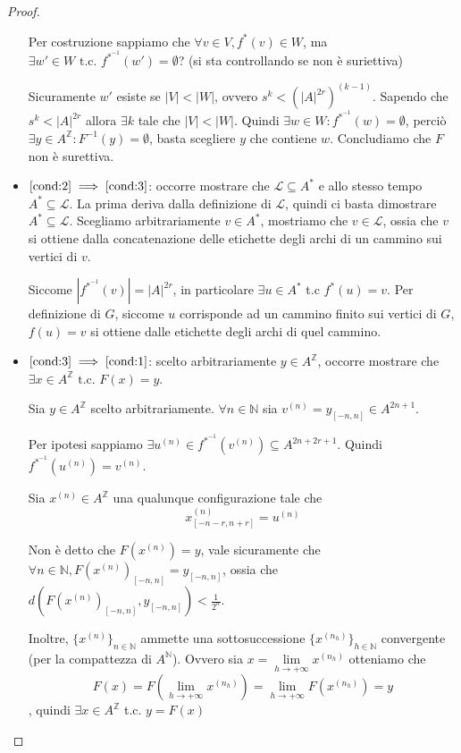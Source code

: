 \begin{teorema}
\begin{proof}
\begin{itemize}
            Per costruzione sappiamo che $\forall v\in V, f^{\ast}(v)\in W$, ma $\exists
            w'\in W\text{ t.c. } f^{\ast^{-1}} (w')= \emptyset$? (si sta controllando se non è suriettiva)
            
            Sicuramente $w'$ esiste se $|V|<|W|$, ovvero  $s^k<(|A|^{2r})^{(k-1)}$.
            Sapendo che $s^k < |A|^{2r}$ allora $\exists k$ tale che  $|V|<|W|$.
            Quindi $\exists w \in W: f^{\ast^{-1}} (w) =\emptyset$, perciò 
            $\exists y \in A^{\mathbb{Z}}: F^{-1}(y) = \emptyset$, basta scegliere 
            $y$ che contiene $w$. Concludiamo che $F$ non è surettiva.
            
            \item $\ref{cond:2}\implies \ref{cond:3}$: occorre mostrare che $\mathcal{L} \subseteq A^\ast$
            e allo stesso tempo $ A^\ast \subseteq\mathcal{L}$. La prima deriva 
            dalla definizione di $\mathcal{L}$, quindi ci basta dimostrare 
            $A^\ast \subseteq\mathcal{L}$. Scegliamo arbitrariamente $v\in  A^\ast$,
            mostriamo che $v\in \mathcal{L}$, ossia che $v$ si ottiene dalla concatenazione
            delle etichette degli archi di un cammino sui vertici di $v$.
            
            Siccome $|f^{\ast^{-1}}(v)| = |A|^{2r}$, in particolare $\exists u \in A^\ast$
            t.c $f^\ast(u) = v$. Per definizione di $G$, siccome $u$ corrisponde 
            ad un cammino finito sui vertici di $G$, $f(u)=v$ si ottiene dalle etichette
            degli archi di quel cammino.
            \item $\ref{cond:3}\implies \ref{cond:1}$: scelto arbitrariamente $y\in A^\mathbb{Z}$,
            occorre mostrare che $\exists x\in A^\mathbb{Z} \text{ t.c. } F(x) =y$.

            Sia $y\in A^\mathbb{Z}$ scelto arbitrariamente. $\forall n\in \mathbb{N}$ 
            sia $v^{(n)} = y_{[-n,n]}\in A^{2n+1}$.

            Per ipotesi sappiamo $\exists u^{(n)}\in f^{\ast^{-1}}(v^{(n)})\subseteq A^{2n+2r+1}$.
            Quindi $f^{\ast^{-1}}(u^{(n)}) = v^{(n)}$.

            Sia $x^{(n)}\in A^\mathbb{Z}$ una qualunque configurazione tale che 
            $$x^{(n)}_{[-n-r,n+r]} = u^{(n)}$$

            Non è detto che $F(x^{(n)})=y$, vale sicuramente che $\forall n \in \mathbb{N},F(x^{(n)})_{[-n,n]}=y_{[-n,n]}$,
            ossia che $d(F(x^{(n)})_{[-n,n]},y_[-n,n])< \frac{1}{2^n}$.
            
            Inoltre, $\{x^{(n)}\}_{n\in \mathbb{N}}$ ammette una sottosuccessione
            $\{x^{(n_h)}\}_{h\in \mathbb{N}}$ convergente (per la compattezza di $A^{\mathbb{N}}$).
            Ovvero sia $x= \lim\limits_{h\rightarrow +\infty}x ^{(n_h)}$ otteniamo  che $$ F(x)= F(\lim\limits_{h\rightarrow +\infty}x ^{(n_h)}) = \lim\limits_{h\rightarrow +\infty} F(x^{(n_h)})=y$$,
            quindi $\exists x \in A^\mathbb{Z}$ t.c. $y = F(x)$
        \end{itemize}
    \end{proof}
\end{teorema}

